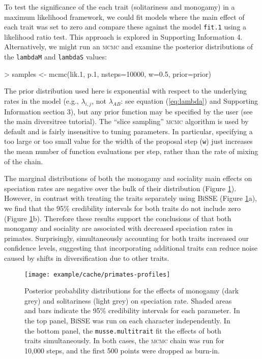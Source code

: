 \documentclass[12pt]{article}
\newenvironment{Schunk}{}{}
\newcommand\code\texttt
\begin{document}
To test the significance of the each trait (solitariness and monogamy)
in a maximum likelihood framework, we could fit models where the main
effect of each trait was set to zero and compare these against the
model \code{fit.1} using a likelihood ratio test.
%
This approach is explored in Supporting Information 4.
%
Alternatively, we might run an \textsc{mcmc} and examine the posterior
distributions of the \code{lambdaM} and \code{lambdaS} values:
%
\begin{Schunk}
\begin{Sinput}
> samples <- mcmc(lik.1, p.1, nsteps=10000, w=0.5, prior=prior)
\end{Sinput}
\end{Schunk}
%
The prior distribution used here is exponential with respect to the
underlying rates in the model (e.g., $\lambda_{i,j}$, not
$\lambda_{AB}$: see equation (\ref{eq:lambda}) and Supporting
Information section 3), but any prior function may be specified by the user
(see the main diversitree tutorial).  The ``slice sampling''
\textsc{mcmc} algorithm \citep{Neal-2003-705} is used by default and
is fairly insensitive to tuning parameters.  In particular, specifying
a too large or too small value for the width of the proposal step
(\code{w}) just increases the mean number of function evaluations per
step, rather than the rate of mixing of the chain.

The marginal distributions of both the monogamy and sociality main
effects on speciation rates are negative over the bulk of their
distribution (Figure \ref{fig:primate-main-effects}).  However, in
contrast with treating the traits separately using BiSSE (Figure
\ref{fig:primate-main-effects}a), we find that the 95\% credibility
intervals for both traits do not include zero (Figure
\ref{fig:primate-main-effects}b).
%
Therefore these results support the conclusions of
\citet{Magnuson-Ford-2012} that both monogamy and sociality are
associated with decreased speciation rates in primates.  Surprisingly,
simultaneously accounting for both traits increased our confidence
levels, suggesting that incorporating additional traits can reduce
noise caused by shifts in diversification due to other traits.

\begin{figure}[p]
  \centering
  \texttt{[image: example/cache/primates-profiles]}
  \caption[``Main effects'' of monogamy and solitariness on speciation
  rate in primates]{Posterior probability distributions for the
    effects of monogamy (dark grey) and solitariness (light grey) on
    speciation rate.  Shaded areas and bars indicate the 95\%
    credibility intervals for each parameter.
    In the top panel, BiSSE was run on each character independently.
    In the bottom panel, the \code{musse.multitrait} fit the effects
    of both traits simultaneously.
    In both cases, the \textsc{mcmc} chain was run for 10,000 steps,
    and the first 500 points were dropped as burn-in.}
  \label{fig:primate-main-effects}
\end{figure}
\end{document}
